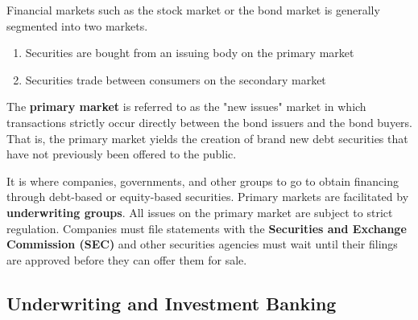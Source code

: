 \documentclass{article}
\begin{document}
    Financial markets such as the stock market or the bond market is generally segmented into two markets. 
    \begin{enumerate}
        \item Securities are bought from an issuing body on the primary market
        \item Securities trade between consumers on the secondary market
    \end{enumerate}

    \begin{definition}
    The \textbf{primary market} is referred to as the "new issues" market in which transactions strictly occur directly between the bond issuers and the bond buyers. That is, the primary market yields the creation of brand new debt securities that have not previously been offered to the public. 

    It is where companies, governments, and other groups to go to obtain financing through debt-based or equity-based securities. Primary markets are facilitated by \textbf{underwriting groups}. All issues on the primary market are subject to strict regulation. Companies must file statements with the \textbf{Securities and Exchange Commission (SEC)} and other securities agencies must wait until their filings are approved before they can offer them for sale. 
    \end{definition}

  \subsection{Underwriting and Investment Banking}
\end{document}
